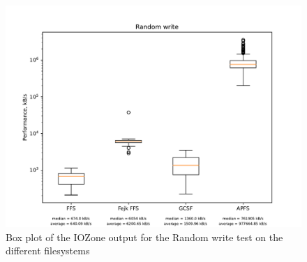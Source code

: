 \begin{figure}[!htb]
	\label{fig:res_box_rndwrite}
	\begin{center}
		\includegraphics[width=1.0\textwidth]{figures/benchmarking/Random write_box.pdf}
	\end{center}
	\caption{Box plot of the IOZone output for the Random write test on the different filesystems}
\end{figure}


